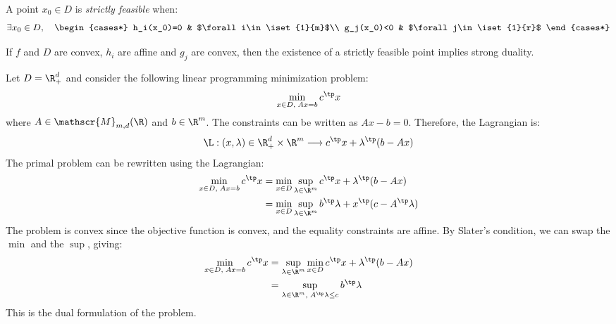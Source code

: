 \documentclass[toc, titlepaged]{../cs-classes/cs-classes}
\begin{document}
\begin{definition}
    A point $x_0\in D$ is \emph{strictly feasible} when:
    \begin{equation*}
        \exists x_0\in D, \quad \begin{cases*}
            h_i(x_0)=0 & $\forall i\in\iset{1}{m}$\\
            g_j(x_0)<0 & $\forall j\in\iset{1}{r}$
        \end{cases*}
    \end{equation*}
\end{definition}

\begin{theorem}
    If $f$ and $D$ are convex, $h_i$ are affine and $g_j$ are convex, then the existence of a strictly feasible point implies strong duality.
\end{theorem}

\begin{example}
    Let $D=\R^d_+$ and consider the following linear programming minimization problem:
    \begin{equation*}
        \min_{x\in D, \; Ax=b}c^\tp x
    \end{equation*}
    where $A\in\mathscr{M}_{m, d}(\R)$ and $b\in\R^m$. The constraints can be written as $Ax-b=0$. Therefore, the Lagrangian is:
    \begin{equation*}
        \L : (x, \lambda) \in \R_+^d \times \R^m \longrightarrow c^\tp x + \lambda^\tp(b-Ax)
    \end{equation*}
    The primal problem can be rewritten using the Lagrangian:
    \begin{equation*}
        \begin{aligned}
            \min_{x\in D, \; Ax=b}c^\tp x &= \min_{x\in D}\sup_{\lambda\in\R^m} c^\tp x+\lambda^\tp(b-Ax)\\
            &= \min_{x\in D}\sup_{\lambda\in\R^m} b^\tp\lambda+x^\tp(c-A^\tp\lambda)
        \end{aligned}
    \end{equation*}
    The problem is convex since the objective function is convex, and the equality constraints are affine. By Slater's condition, we can swap the $\min$ and the $\sup$, giving:
    \begin{equation*}
        \begin{aligned}
            \min_{x\in D, \; Ax=b}c^\tp x &= \sup_{\lambda\in\R^m} \min_{x\in D} c^\tp x+\lambda^\tp(b-Ax)\\
            &= \sup_{\lambda\in\R^m, \; A^\tp\lambda\leq c} b^\tp\lambda
        \end{aligned}
    \end{equation*}
    This is the dual formulation of the problem.
\end{example}
\end{document}

